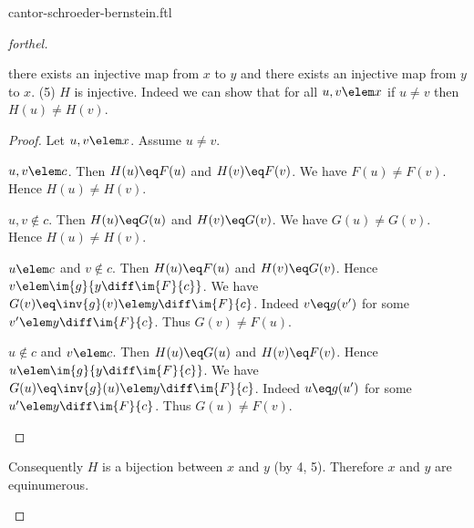 \documentclass{article}
\begin{document}
\begin{smodule}{cantor-schroeder-bernstein.ftl}
\begin{proof}[forthel]
\begin{case}{there exists an injective map from $x$ to $y$ and there exists an injective map from $y$ to $x$.}
    (5) $H$ is injective.
    Indeed we can show that for all $u, v \elem x$ if $u \neq v$ then $H(u) \neq H(v)$.
    \begin{proof}
      Let $u,v \elem x$.
      Assume $u \neq v$.

      \begin{case}{$u,v \elem c$.}
        Then $H(u) \eq F(u)$ and $H(v) \eq F(v)$.
        We have $F(u) \neq F(v)$.
        Hence $H(u) \neq H(v)$.
      \end{case}

      \begin{case}{$u,v \notin c$.}
        Then $H(u) \eq G(u)$ and $H(v) \eq G(v)$.
        We have $G(u) \neq G(v)$.
        Hence $H(u) \neq H(v)$.
      \end{case}

      \begin{case}{$u \elem c$ and $v \notin c$.}
        Then $H(u) \eq F(u)$ and $H(v) \eq G(v)$.
        Hence $v \elem \im{g}{y \diff \im{F}{c}}$.
        We have $G(v) \eq \inv{g}(v) \elem y \diff \im{F}{c}$.
        Indeed $v \eq g(v')$ for some $v' \elem y \diff \im{F}{c}$.
        Thus $G(v) \neq F(u)$.
      \end{case}

      \begin{case}{$u \notin c$ and $v \elem c$.}
        Then $H(u) \eq G(u)$ and $H(v) \eq F(v)$.
        Hence $u \elem \im{g}{y \diff \im{F}{c}}$.
        We have $G(u) \eq \inv{g}(u) \elem y \diff \im{F}{c}$.
        Indeed $u \eq g(u')$ for some $u' \elem y \diff \im{F}{c}$.
        Thus $G(u) \neq F(v)$.
      \end{case}
    \end{proof}

    Consequently $H$ is a bijection between $x$ and $y$ (by 4, 5).
    Therefore $x$ and $y$ are equinumerous.
  \end{case}
\end{proof}

\printbibliography
{}
\end{smodule}
\end{document}
